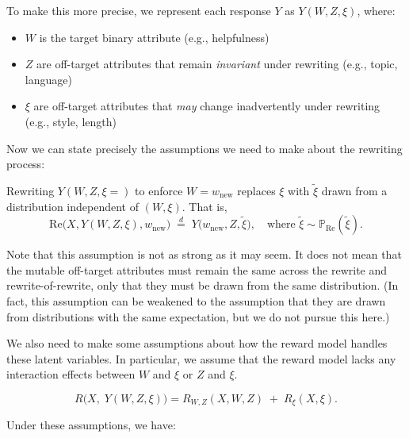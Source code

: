 \noindent To make this more precise, we represent each response $Y$ as $Y(W, Z, \xi)$, where:
\begin{itemize}
    \item $W$ is the target binary attribute (e.g., helpfulness)
    \item $Z$ are off-target attributes that remain \emph{invariant} under rewriting (e.g., topic, language)
    \item $\xi$ are off-target attributes that \emph{may} change inadvertently under rewriting (e.g., style, length)
\end{itemize}

\noindent Now we can state precisely the assumptions we need to make about the rewriting process:

\begin{assumption}
    \label{assump:rewrite_dist}
    Rewriting $Y(W,Z,\xi = )$ to enforce $W=w_{\text{new}}$ replaces $\xi$ with $\tilde{\xi}$ drawn from a distribution independent of $(W,\xi)$. That is,
    \[
    \text{Re}\bigl(X, Y(W,Z,\xi), w_{\text{new}} \bigr) \;\stackrel{d}{=}\; Y\bigl(w_{\text{new}},Z,\tilde{\xi}\bigr),
    \quad\text{where } \tilde{\xi} \sim \mathbb{P}_{\mathrm{Re}}(\tilde{\xi}).
    \]
\end{assumption}

Note that this assumption is not as strong as it may seem. It does not mean that the mutable off-target attributes must remain the same across the rewrite and rewrite-of-rewrite, only that they must be drawn from the same distribution. (In fact, this assumption can be weakened to the assumption that they are drawn from distributions with the same expectation, but we do not pursue this here.)

We also need to make some assumptions about how the reward model handles these latent variables. In particular, we assume that the reward model lacks any interaction effects between $W$ and $\xi$ or $Z$ and $\xi$.

\begin{assumption}
\label{assump:additive}
\[
R\bigl(X,\;Y(W,Z,\xi)\bigr) = R_{W,Z}(X,W,Z) \;+\; R_{\xi}(X,\xi).
\]
\end{assumption}

\noindent Under these assumptions, we have:

